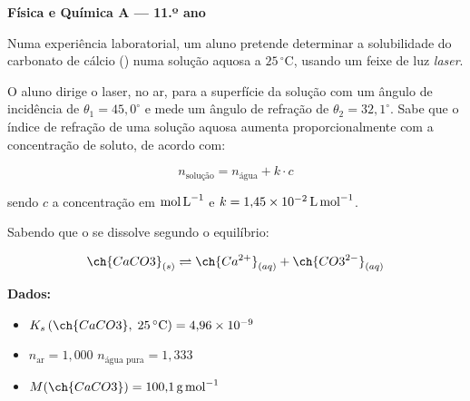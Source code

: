 \documentclass[12pt,a4paper]{article}
\begin{document}
\begin{center}
  {\small\textcolor{azul}{\textbf{Física e Química A --- 11.º ano}}}
\end{center}

\bigskip

\begin{mdframed}[style=enunciado]

Numa experiência laboratorial, um aluno pretende determinar a solubilidade do
carbonato de cálcio () numa solução aquosa a \(25\,^\circ\text{C}\),
usando um feixe de luz \textit{laser}.

\medskip

O aluno dirige o laser, no ar, para a superfície da solução com um ângulo de
incidência de \(\theta_1 = 45{,}0^\circ\) e mede um ângulo de refração de
\(\theta_2 = 32{,}1^\circ\). Sabe que o índice de refração de uma solução
aquosa aumenta proporcionalmente com a concentração de soluto, de acordo com:

\[
  n_{\text{solução}} = n_{\text{água}} + k \cdot c
\]

sendo \(c\) a concentração em \(\text{mol\,L}^{-1}\) e
\(k = 1{,}45 \times 10^{-2}\,\text{L\,mol}^{-1}\).

\medskip

Sabendo que o  se dissolve segundo o equilíbrio:

\[
  \ch{CaCO3}_{(s)} \rightleftharpoons \ch{Ca^{2+}}_{(aq)} + \ch{CO3^{2-}}_{(aq)}
\]

\end{mdframed}

\medskip

\begin{mdframed}[style=dados]
\textbf{Dados:}
\begin{itemize}[leftmargin=1.5em, itemsep=2pt, topsep=4pt]
  \item $K_s\,(\ch{CaCO3},\; 25\,^\circ\text{C}) = 4{,}96 \times 10^{-9}$
  \item $n_{\text{ar}} = 1{,}000$ \quad $n_{\text{água pura}} = 1{,}333$
  \item $M(\ch{CaCO3}) = 100{,}1\,\text{g\,mol}^{-1}$
\end{itemize}
\end{mdframed}
\end{document}
